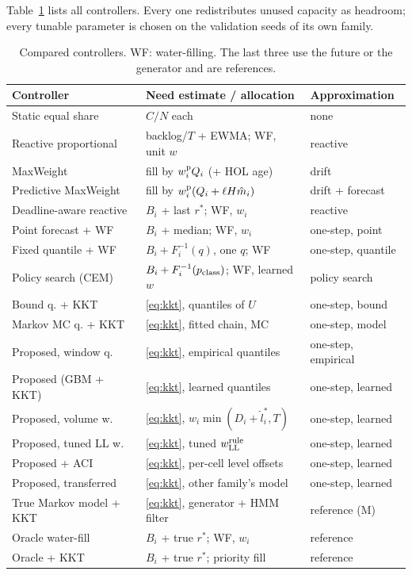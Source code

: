 \documentclass[journal]{IEEEtran}
\newcommand{\rstar}{r^{\ast}}
\begin{document}
Table~\ref{tab:controllers} lists all controllers. Every one redistributes unused capacity as headroom; every tunable parameter is chosen on the validation seeds of its own family.

\begin{table}[t]
\caption{Compared controllers. WF: water-filling. The last three use the future or the generator and are references.}
\label{tab:controllers}
\centering
\scriptsize
\setlength{\tabcolsep}{3pt}
\begin{tabular}{@{}l@{\hspace{3pt}}l@{\hspace{3pt}}l@{}}
\hline
Controller & Need estimate / allocation & Approximation \\
\hline
Static equal share & $C/N$ each & none \\
Reactive proportional & backlog/$T$ + EWMA; WF, unit $w$ & reactive \\
MaxWeight \cite{neely2010} & fill by $w^{\rm p}_iQ_i$ (+ HOL age) & drift \\
Predictive MaxWeight \cite{huang2016} & fill by $w^{\rm p}_i(Q_i + \ell H\hat m_i)$ & drift + forecast \\
Deadline-aware reactive & $B_i$ + last $\rstar$; WF, $w_i$ & reactive \\
Point forecast + WF & $B_i$ + median; WF, $w_i$ & one-step, point \\
Fixed quantile + WF & $B_i + F_i^{-1}(q)$, one $q$; WF & one-step, quantile \\
Policy search (CEM) & $B_i + F_i^{-1}(p_{\rm class})$; WF, learned $w$ & policy search \\
Bound q. + KKT & \eqref{eq:kkt}, quantiles of $U$ & one-step, bound \\
Markov MC q. + KKT & \eqref{eq:kkt}, fitted chain, MC & one-step, model \\
Proposed, window q. & \eqref{eq:kkt}, empirical quantiles & one-step, empirical \\
Proposed (GBM + KKT) & \eqref{eq:kkt}, learned quantiles & one-step, learned \\
Proposed, volume w. & \eqref{eq:kkt}, $w_i\min(D_i + \hat l^\ast_i, T)$ & one-step, learned \\
Proposed, tuned LL w. & \eqref{eq:kkt}, tuned $w^{\rm rule}_{\rm LL}$ & one-step, learned \\
Proposed + ACI & \eqref{eq:kkt}, per-cell level offsets & one-step, learned \\
Proposed, transferred & \eqref{eq:kkt}, other family's model & one-step, learned \\
True Markov model + KKT & \eqref{eq:kkt}, generator + HMM filter & reference (M) \\
Oracle water-fill & $B_i$ + true $\rstar$; WF, $w_i$ & reference \\
Oracle + KKT & $B_i$ + true $\rstar$; priority fill & reference \\
\hline
\end{tabular}
\end{table}
\end{document}
